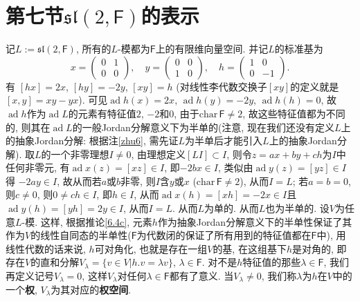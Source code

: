 \documentclass{ctexart}%
\theoremstyle{definition}
\theoremstyle{remark}
\DeclareMathOperator{\ad}{ad}
\begin{document}
\section*{第七节\quad$\mathfrak{sl}(2,\mathsf{F})$的表示}
记$L:=\mathfrak{sl}(2,\mathsf{F})$, 所有的$L$-模都为$\mathsf{F}$上的有限维向量空间. 并记$L$的标准基为
$$x = \left(\begin{array}{cc} 0 & 1 \\ 0 & 0 \end{array}\right),\quad y = \left(\begin{array}{cc} 0 & 0 \\ 1 & 0 \end{array}\right),\quad h = \left(\begin{array}{cc} 1 & 0 \\ 0 & -1 \end{array}\right).$$
有 $[hx]=2x$, $[hy]=-2y$, $[xy]=h$ (对线性李代数交换子$[xy]$的定义就是$[x,y]=xy-yx$). 可见$\ad h(x)=2x$, $\ad h(y) = -2y$, $\ad h(h)=0$, 故$\ad h$作为$\ad L$的元素有特征值$2$, $-2$和$0$, 由于$\mathrm{char}\,\mathsf{F}\neq 2$, 故这些特征值都为不同的, 则其在$\ad L$的一般Jordan分解意义下为半单的(注意, 现在我们还没有定义$L$上的抽象Jordan分解: 根据注\ref{zhu6}, 需先证$L$为半单后才能引入$L$上的抽象Jordan分解). 取$L$的一个非零理想$I\neq 0$, 由理想定义$[LI]\subset I$, 则令$z=ax+by+ch$为$I$中任何非零元, 有$\ad x(z)=[xz]\in I$, 即$-2bx \in I$, 类似由$\ad y(z) =[yz] \in I$得 $-2ay \in I$, 故从而若$a$或$b$非零, 则$I$含$y$或$x$ ($\mathrm{char}\,\mathsf{F}\neq 2$), 从而$I=L$; 若$a=b=0$, 则$c\neq 0$, 则$0\neq ch\in I$, 即$h\in I$, 从而$\ad x(h)=[xh]=-2x\in I$且$\ad y(h) = [yh]=2y \in I$, 从而$I=L$. 从而$L$为单的. 从而$L$也为半单的. 设$V$为任意$L$-模. 这样, 根据推论\ref{6.4c}, 元素$h$作为抽象Jordan分解意义下的半单性保证了其作为$V$的线性自同态的半单性($\mathsf{F}$为代数闭的保证了所有用到的特征值都在$\mathsf{F}$中), 用线性代数的话来说, $h$可对角化, 也就是存在一组$V$的基, 在这组基下$h$是对角的, 即存在$V$的直和分解$V_\lambda = \{v\in V|h.v=\lambda v\}$, $\lambda \in \mathsf{F}$. 对不是$h$特征值的那些$\lambda \in \mathsf{F}$, 我们再定义记号$V_\lambda = 0$, 这样$V_\lambda$对任何$\lambda \in \mathsf{F}$都有了意义. 当$V_\lambda \neq 0$, 我们称$\lambda$为$h$在$V$中的一个\textbf{权}, $V_\lambda$为其对应的\textbf{权空间}. 
\end{document}

